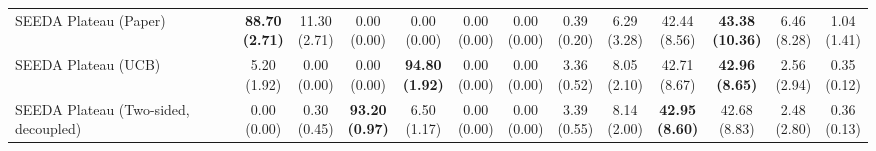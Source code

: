 \begin{table}[H]
{\begin{tabular}{l|cccccc|cccccc}
SEEDA Plateau (Paper) & \bfseries \makecell{88.70 \\ (2.71)} & \makecell{11.30 \\ (2.71)} & {\cellcolor[HTML]{C8E6C9}} \makecell{0.00 \\ (0.00)} & \makecell{0.00 \\ (0.00)} & \makecell{0.00 \\ (0.00)} & \makecell{0.00 \\ (0.00)} & \makecell{0.39 \\ (0.20)} & \makecell{6.29 \\ (3.28)} & {\cellcolor[HTML]{C8E6C9}} \makecell{42.44 \\ (8.56)} & \bfseries \makecell{43.38 \\ (10.36)} & \makecell{6.46 \\ (8.28)} & \makecell{1.04 \\ (1.41)} \\
SEEDA Plateau (UCB) & \makecell{5.20 \\ (1.92)} & \makecell{0.00 \\ (0.00)} & {\cellcolor[HTML]{C8E6C9}} \makecell{0.00 \\ (0.00)} & \bfseries \makecell{94.80 \\ (1.92)} & \makecell{0.00 \\ (0.00)} & \makecell{0.00 \\ (0.00)} & \makecell{3.36 \\ (0.52)} & \makecell{8.05 \\ (2.10)} & {\cellcolor[HTML]{C8E6C9}} \makecell{42.71 \\ (8.67)} & \bfseries \makecell{42.96 \\ (8.65)} & \makecell{2.56 \\ (2.94)} & \makecell{0.35 \\ (0.12)} \\
SEEDA Plateau (Two-sided, decoupled) & \makecell{0.00 \\ (0.00)} & \makecell{0.30 \\ (0.45)} & {\cellcolor[HTML]{C8E6C9}} \bfseries \makecell{93.20 \\ (0.97)} & \makecell{6.50 \\ (1.17)} & \makecell{0.00 \\ (0.00)} & \makecell{0.00 \\ (0.00)} & \makecell{3.39 \\ (0.55)} & \makecell{8.14 \\ (2.00)} & {\cellcolor[HTML]{C8E6C9}} \bfseries \makecell{42.95 \\ (8.60)} & \makecell{42.68 \\ (8.83)} & \makecell{2.48 \\ (2.80)} & \makecell{0.36 \\ (0.13)} \\

\end{tabular}}
\end{table}

